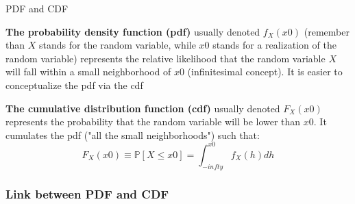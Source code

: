\documentclass{beamer}
\newenvironment{wideitemize}{\itemize\addtolength{\itemsep}{10pt}}{\enditemize}
\begin{document}
\begin{frame}{PDF and CDF}
  \begin{wideitemize}
  \item \textbf{The probability density function (pdf)} usually denoted $f_X(x0)$ (remember than $X$ stands for the random variable, while $x0$ stands for a realization of the random variable) represents the relative likelihood that the random variable $X$ will fall within a small neighborhood of $x0$ (infinitesimal concept). It is easier to conceptualize the pdf via the cdf
  \item \textbf{The cumulative distribution function (cdf)} usually denoted $F_X(x0)$ represents the probability that the random variable will be lower than $x0$. It cumulates the pdf ("all the small neighborhoods") such that:
    \begin{equation*}
F_X(x0) \equiv \mathbb{P}[X \leq x0] = \int_{-infty}^{x0} f_X(h) dh      
    \end{equation*}    
  \end{wideitemize}  
\end{frame}


\begin{frame}
\frametitle{Link between PDF and CDF}
\end{frame}
\end{document}
